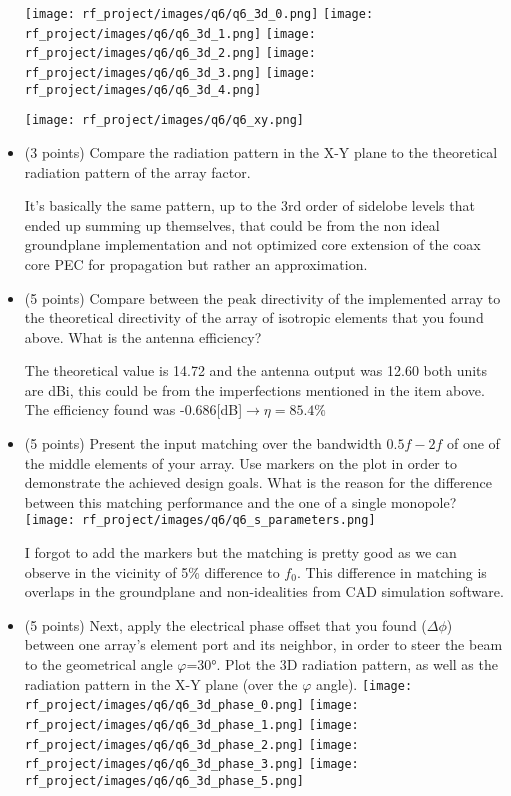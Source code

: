 \documentclass[12pt, letterpaper]{article}
\begin{document}
\begin{itemize}
  \texttt{[image: rf\_project/images/q6/q6\_3d\_0.png]}
  \texttt{[image: rf\_project/images/q6/q6\_3d\_1.png]}
  \texttt{[image: rf\_project/images/q6/q6\_3d\_2.png]}
  \texttt{[image: rf\_project/images/q6/q6\_3d\_3.png]}
  \texttt{[image: rf\_project/images/q6/q6\_3d\_4.png]}

  \texttt{[image: rf\_project/images/q6/q6\_xy.png]}


  \item (3 points) Compare the radiation pattern in the X-Y plane to the theoretical radiation pattern of the array factor.

  {\color{blue} It's basically the same pattern, up to the 3rd order of sidelobe levels that ended up summing up themselves, that could be from the non ideal groundplane implementation and not optimized core extension of the coax core PEC for propagation but rather an approximation.}
  \item (5 points) Compare between the peak directivity of the implemented array to the theoretical directivity of the array of isotropic elements that you found above. What is the antenna efficiency?

  {\color{blue}The theoretical value is 14.72 and the antenna output was 12.60 both units are dBi, this could be from the imperfections mentioned in the item above. The efficiency found was -0.686[dB]$\rightarrow\eta=85.4\%$}
  \item (5 points) Present the input matching over the bandwidth $0.5f - 2f$ of one of the middle elements of your array. Use markers on the plot in order to demonstrate the achieved design goals. What is the reason for the difference between this matching performance and the one of a single monopole?
  \texttt{[image: rf\_project/images/q6/q6\_s\_parameters.png]}

  {\color{blue} I forgot to add the markers but the matching is pretty good as we can observe in the vicinity of 5\% difference to $f_0$. This difference in matching is overlaps in the groundplane and non-idealities from CAD simulation software.}

  \item (5 points) Next, apply the electrical phase offset that you found ($\Delta\phi$) between one array's element port and its neighbor, in order to steer the beam to the geometrical angle $\varphi$=30°. Plot the 3D radiation pattern, as well as the radiation pattern in the X-Y plane (over the $\varphi$ angle).
  \texttt{[image: rf\_project/images/q6/q6\_3d\_phase\_0.png]}
  \texttt{[image: rf\_project/images/q6/q6\_3d\_phase\_1.png]}
  \texttt{[image: rf\_project/images/q6/q6\_3d\_phase\_2.png]}
  \texttt{[image: rf\_project/images/q6/q6\_3d\_phase\_3.png]}
  \texttt{[image: rf\_project/images/q6/q6\_3d\_phase\_5.png]}


\end{itemize}
\end{document}
